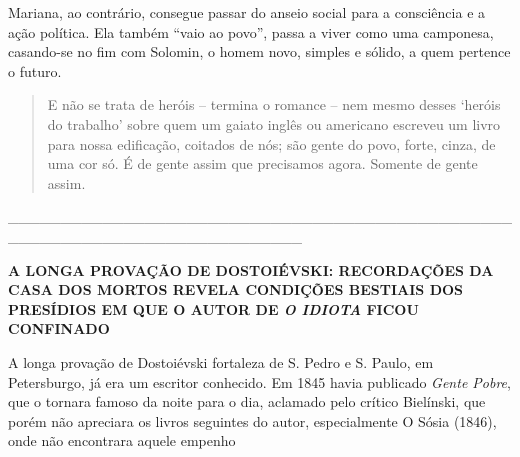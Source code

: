 Mariana, ao contrário, consegue passar do anseio social para a
consciência e a ação política. Ela também ``vaio ao povo'', passa a
viver como uma camponesa, casando-se no fim com Solomin, o homem novo,
simples e sólido, a quem pertence o futuro.

\begin{quote}
E não se trata de heróis -- termina o romance -- nem mesmo desses
`heróis do trabalho' sobre quem um gaiato inglês ou americano escreveu
um livro para nossa edificação, coitados de nós; são gente do povo,
forte, cinza, de uma cor só. É de gente assim que precisamos agora.
Somente de gente assim.
\end{quote}

\_\_\_\_\_\_\_\_\_\_\_\_\_\_\_\_\_\_\_\_\_\_\_\_\_\_\_\_\_\_\_\_\_\_\_\_\_\_\_\_\_\_\_\_\_\_\_\_\_\_\_\_\_\_\_\_\_\_\_\_\_\_\_\_\_\_\_\_\_\_\_\_\_\_\_\_

\textbf{A LONGA PROVAÇÃO DE DOSTOIÉVSKI: RECORDAÇÕES DA CASA DOS MORTOS
REVELA CONDIÇÕES BESTIAIS DOS PRESÍDIOS EM QUE O AUTOR DE \emph{O
IDIOTA} FICOU CONFINADO}

A longa provação de Dostoiévski fortaleza de S. Pedro e S. Paulo, em
Petersburgo, já era um escritor conhecido. Em 1845 havia publicado
\emph{Gente Pobre}, que o tornara famoso da noite para o dia, aclamado
pelo crítico Bielínski, que porém não apreciara os livros seguintes do
autor, especialmente O Sósia (1846), onde não encontrara aquele empenho

